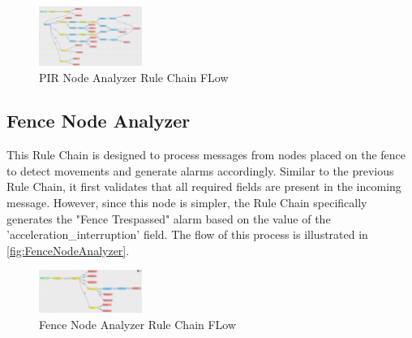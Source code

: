\begin{figure}[H]
    \centering
    \includegraphics[width=0.3\textwidth]{./images/8/PirNodeAnalyzer.PNG}
    \caption{PIR Node Analyzer Rule Chain FLow}
    \label{fig:PirNodeAnalyzer}
\end{figure}

\subsection{Fence Node Analyzer}
This Rule Chain is designed to process messages from nodes placed on the fence to detect movements and generate alarms accordingly.  
Similar to the previous Rule Chain, it first validates that all required fields are present in the incoming message. However, since this node is simpler, the Rule 
Chain specifically generates the "Fence Trespassed" alarm based on the value of the 'acceleration\_interruption' field. The flow of this process is illustrated in \autoref{fig:FenceNodeAnalyzer}.

\begin{figure}[H]
    \centering
    \includegraphics[width=0.3\textwidth]{./images/8/FenceNodeAnalyzer.PNG}
    \caption{Fence Node Analyzer Rule Chain FLow}
    \label{fig:FenceNodeAnalyzer}
\end{figure}